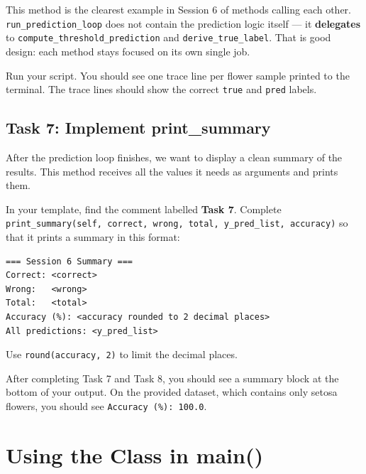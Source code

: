 \noindent
This method is the clearest example in Session 6 of methods calling each other.
\texttt{run\_prediction\_loop} does not contain the prediction logic itself --- it \textbf{delegates} to \texttt{compute\_threshold\_prediction} and \texttt{derive\_true\_label}.
That is good design: each method stays focused on its own single job.

\begin{tcolorbox}[title=Checkpoint]
Run your script.
You should see one trace line per flower sample printed to the terminal.
The trace lines should show the correct \texttt{true} and \texttt{pred} labels.
\end{tcolorbox}

\subsection{Task 7: Implement print\_summary}

\begin{tcolorbox}[title=Task 7: Implement print\_summary]
After the prediction loop finishes, we want to display a clean summary of the results.
This method receives all the values it needs as arguments and prints them.

\medskip
\noindent
In your template, find the comment labelled \textbf{Task 7}.
Complete \texttt{print\_summary(self, correct, wrong, total, y\_pred\_list, accuracy)} so that it prints a summary in this format:
\begin{verbatim}
=== Session 6 Summary ===
Correct: <correct>
Wrong:   <wrong>
Total:   <total>
Accuracy (%): <accuracy rounded to 2 decimal places>
All predictions: <y_pred_list>
\end{verbatim}
\end{tcolorbox}

\noindent
Use \texttt{round(accuracy, 2)} to limit the decimal places.

\begin{tcolorbox}[title=Checkpoint]
After completing Task 7 and Task 8, you should see a summary block at the bottom of your output.
On the provided dataset, which contains only setosa flowers, you should see \texttt{Accuracy (\%): 100.0}.
\end{tcolorbox}

\section{Using the Class in main()}


